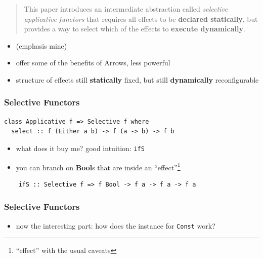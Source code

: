 \documentclass[aspectratio=169]{beamer}
\begin{document}
\begin{frame}
    \begin{quote}
    This paper introduces an intermediate abstraction called
    \textit{selective applicative functors} that requires all effects
    to be \textbf{declared statically}, but provides a way to select which of
    the effects to \textbf{execute dynamically}.
  \end{quote}

  \begin{itemize}
  \item (emphasis mine)
  \item offer some of the benefits of Arrows, less powerful
  \item structure of effects still \textbf{statically} fixed, but still \textbf{dynamically} reconfigurable
  \end{itemize}
\end{frame}

\begin{frame}[fragile]
  \frametitle{Selective Functors}
  \begin{verbatim}
class Applicative f => Selective f where
  select :: f (Either a b) -> f (a -> b) -> f b
  \end{verbatim}
  \vspace{5mm}
  \begin{itemize}
  \item what does it buy me? good intuition: \texttt{ifS}
  \item you can branch on \textbf{Bool}s that are inside an ``effect''\footnote{``effect'' with the usual caveats}
  \end{itemize}
  \begin{verbatim}
    ifS :: Selective f => f Bool -> f a -> f a -> f a
  \end{verbatim}
\end{frame}

\begin{frame}
  \frametitle{Selective Functors}
\end{frame}

\begin{frame}[fragile]
  \begin{itemize}
  \item now the interesting part: how does the instance for \texttt{Const} work?
  \end{itemize}
\end{frame}
\end{document}
